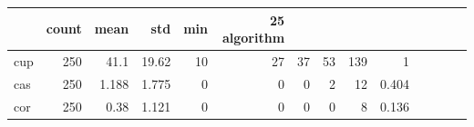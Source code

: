 \begin{tabular}{lrrrrrrrrr}
\toprule
 & count & mean & std & min & 25%
algorithm &  &  &  &  &  &  &  &  &  \\
\midrule
cup & 250 & 41.1 & 19.62 & 10 & 27 & 37 & 53 & 139 & 1 \\
cas & 250 & 1.188 & 1.775 & 0 & 0 & 0 & 2 & 12 & 0.404 \\
cor & 250 & 0.38 & 1.121 & 0 & 0 & 0 & 0 & 8 & 0.136 \\
\bottomrule
\end{tabular}
